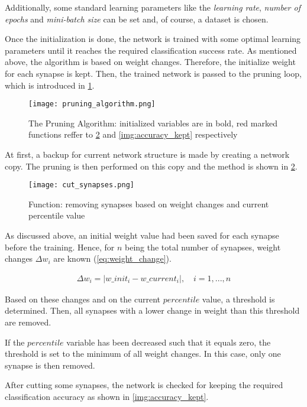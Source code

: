 Additionally, some standard learning parameters like the \textit{learning rate}, \textit{number of epochs} and \textit{mini-batch size} can be set and, of course, a dataset is chosen.

Once the initialization is done, the network is trained with some optimal learning parameters until it reaches the required classification success rate. As mentioned above, the algorithm is based on weight changes. Therefore, the initialize weight for each synapse is kept. Then, the trained network is passed to the pruning loop, which is introduced in \cref{img:pruning_algorithm}.

\begin{figure}[H]
  \centering
  \texttt{[image: pruning\_algorithm.png]}
  \caption{The Pruning Algorithm: initialized variables are in bold, red marked functions reffer to \ref{img:cut_synapses} and \ref{img:accuracy_kept} respectively}
  \label{img:pruning_algorithm}
\end{figure}

At first, a backup for current network structure is made by creating a network copy. The pruning is then performed on this copy and the method is shown in \cref{img:cut_synapses}.

\begin{figure}[H]
  \centering
  \texttt{[image: cut\_synapses.png]}
  \caption{Function: removing synapses based on weight changes and current percentile value}
  \label{img:cut_synapses}
\end{figure}

As discussed above, an initial weight value had been saved for each synapse before the training. Hence, for $ n $ being the total number of synapses, weight changes $ \Delta w_i $ are known (\ref{eq:weight_change}).

\begin{align} \label{eq:weight_change}
\Delta w_i = |w\_init_i - w\_current_i|, \quad i = 1, ..., n
\end{align}

Based on these changes and on the current $ percentile $ value, a threshold is determined. Then, all synapses with a lower change in weight than this threshold are removed. 

If the $ percentile $ variable has been decreased such that it equals zero, the threshold is set to the minimum of all weight changes. In this case, only one synapse is then removed.

After cutting some synapses, the network is checked for keeping the required classification accuracy as shown in \cref{img:accuracy_kept}.

